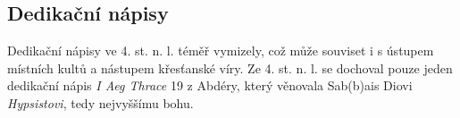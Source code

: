 
\subsection[dedikační-nápisy-17]{Dedikační nápisy}

Dedikační nápisy ve 4. st. n. l. téměř vymizely, což může souviset i s ústupem místních kultů a nástupem křesťanské víry. Ze 4. st. n. l. se dochoval pouze jeden dedikační nápis {\em I Aeg Thrace} 19 z Abdéry, který věnovala Sab(b)ais Diovi {\em Hypsistovi}, tedy nejvyššímu bohu.

